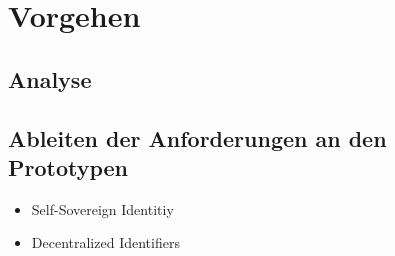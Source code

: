 \section{Vorgehen}

\subsection{Analyse}


\subsection{Ableiten der Anforderungen an den Prototypen}

    \begin{itemize}
        \item Self-Sovereign Identitiy
        \item Decentralized Identifiers
    \end{itemize}